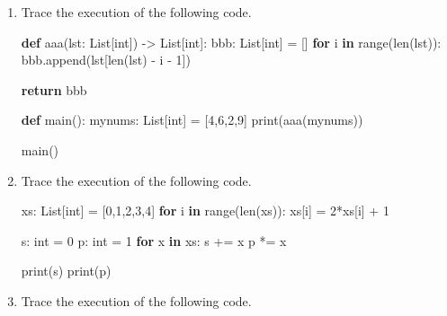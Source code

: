 \documentclass[]{article}
\newenvironment{Shaded}{}{}
\newcommand{\BuiltInTok}[1]{#1}
\newcommand{\ControlFlowTok}[1]{\textcolor[rgb]{0.00,0.44,0.13}{\textbf{#1}}}
\newcommand{\DecValTok}[1]{\textcolor[rgb]{0.25,0.63,0.44}{#1}}
\newcommand{\KeywordTok}[1]{\textcolor[rgb]{0.00,0.44,0.13}{\textbf{#1}}}
\newcommand{\NormalTok}[1]{#1}
\newcommand{\OperatorTok}[1]{\textcolor[rgb]{0.40,0.40,0.40}{#1}}
\begin{document}
\begin{enumerate}
\def\labelenumi{\arabic{enumi}.}
\item
  Trace the execution of the following code.

\begin{Shaded}
\begin{Highlighting}[]
\KeywordTok{def}\NormalTok{ aaa(lst: List[}\BuiltInTok{int}\NormalTok{]) }\OperatorTok{->}\NormalTok{ List[}\BuiltInTok{int}\NormalTok{]:}
\NormalTok{    bbb: List[}\BuiltInTok{int}\NormalTok{] }\OperatorTok{=}\NormalTok{ []}
    \ControlFlowTok{for}\NormalTok{ i }\KeywordTok{in} \BuiltInTok{range}\NormalTok{(}\BuiltInTok{len}\NormalTok{(lst)):}
\NormalTok{        bbb.append(lst[}\BuiltInTok{len}\NormalTok{(lst) }\OperatorTok{-}\NormalTok{ i }\OperatorTok{-} \DecValTok{1}\NormalTok{])}

    \ControlFlowTok{return}\NormalTok{ bbb}

\KeywordTok{def}\NormalTok{ main():}
\NormalTok{    mynums: List[}\BuiltInTok{int}\NormalTok{] }\OperatorTok{=}\NormalTok{ [}\DecValTok{4}\NormalTok{,}\DecValTok{6}\NormalTok{,}\DecValTok{2}\NormalTok{,}\DecValTok{9}\NormalTok{]}
    \BuiltInTok{print}\NormalTok{(aaa(mynums))}

\NormalTok{main()}
\end{Highlighting}
\end{Shaded}
\item
  Trace the execution of the following code.

\begin{Shaded}
\begin{Highlighting}[]
\NormalTok{xs: List[}\BuiltInTok{int}\NormalTok{] }\OperatorTok{=}\NormalTok{ [}\DecValTok{0}\NormalTok{,}\DecValTok{1}\NormalTok{,}\DecValTok{2}\NormalTok{,}\DecValTok{3}\NormalTok{,}\DecValTok{4}\NormalTok{]}
\ControlFlowTok{for}\NormalTok{ i }\KeywordTok{in} \BuiltInTok{range}\NormalTok{(}\BuiltInTok{len}\NormalTok{(xs)):}
\NormalTok{    xs[i] }\OperatorTok{=} \DecValTok{2}\OperatorTok{*}\NormalTok{xs[i] }\OperatorTok{+} \DecValTok{1}

\NormalTok{s: }\BuiltInTok{int} \OperatorTok{=} \DecValTok{0}
\NormalTok{p: }\BuiltInTok{int} \OperatorTok{=} \DecValTok{1}
\ControlFlowTok{for}\NormalTok{ x }\KeywordTok{in}\NormalTok{ xs:}
\NormalTok{    s }\OperatorTok{+=}\NormalTok{ x}
\NormalTok{    p }\OperatorTok{*=}\NormalTok{ x}

\BuiltInTok{print}\NormalTok{(s)}
\BuiltInTok{print}\NormalTok{(p)}
\end{Highlighting}
\end{Shaded}
\item
  Trace the execution of the following code.


\end{enumerate}
\end{document}

